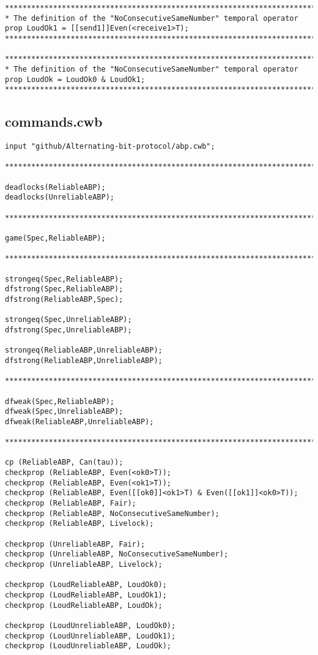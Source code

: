 \begin{verbatim}
*******************************************************************************
* The definition of the "NoConsecutiveSameNumber" temporal operator
prop LoudOk1 = [[send1]]Even(<receive1>T);
*******************************************************************************

*******************************************************************************
* The definition of the "NoConsecutiveSameNumber" temporal operator
prop LoudOk = LoudOk0 & LoudOk1;
*******************************************************************************
\end{verbatim}

\subsection{commands.cwb}\label{sec:cwb-commands}
\begin{verbatim}
input "github/Alternating-bit-protocol/abp.cwb";

*******************************************************************************

deadlocks(ReliableABP);
deadlocks(UnreliableABP);

*******************************************************************************

game(Spec,ReliableABP);

*******************************************************************************

strongeq(Spec,ReliableABP);
dfstrong(Spec,ReliableABP);
dfstrong(ReliableABP,Spec);

strongeq(Spec,UnreliableABP);
dfstrong(Spec,UnreliableABP);

strongeq(ReliableABP,UnreliableABP);
dfstrong(ReliableABP,UnreliableABP);

*******************************************************************************

dfweak(Spec,ReliableABP);
dfweak(Spec,UnreliableABP);
dfweak(ReliableABP,UnreliableABP);

*******************************************************************************

cp (ReliableABP, Can(tau));
checkprop (ReliableABP, Even(<ok0>T));
checkprop (ReliableABP, Even(<ok1>T));
checkprop (ReliableABP, Even([[ok0]]<ok1>T) & Even([[ok1]]<ok0>T));
checkprop (ReliableABP, Fair);
checkprop (ReliableABP, NoConsecutiveSameNumber);
checkprop (ReliableABP, Livelock);

checkprop (UnreliableABP, Fair);
checkprop (UnreliableABP, NoConsecutiveSameNumber);
checkprop (UnreliableABP, Livelock);

checkprop (LoudReliableABP, LoudOk0);
checkprop (LoudReliableABP, LoudOk1);
checkprop (LoudReliableABP, LoudOk);

checkprop (LoudUnreliableABP, LoudOk0);
checkprop (LoudUnreliableABP, LoudOk1);
checkprop (LoudUnreliableABP, LoudOk);
\end{verbatim}

